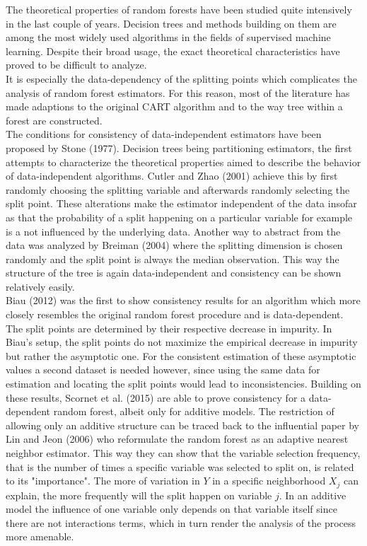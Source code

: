 {The theoretical properties of random forests have been studied quite intensively in the last couple of years. Decision trees and methods building on them are among the most widely used algorithms in the fields of supervised machine learning. Despite their broad usage, the exact theoretical characteristics have proved to be difficult to analyze. \\
It is especially the data-dependency of the splitting points which complicates the analysis of random forest estimators. For this reason, most of the literature has made adaptions to the original CART algorithm and to the way tree within a forest are constructed. \\
The conditions for consistency of data-independent estimators have been proposed by Stone (1977). Decision trees being partitioning estimators, the first attempts to characterize the theoretical properties aimed to describe the behavior of data-independent algorithms. Cutler and Zhao (2001) achieve this by first randomly choosing the splitting variable and afterwards randomly selecting the split point. These alterations make the estimator independent of the data insofar as that the probability of a split happening on a particular variable for example is a not influenced by the underlying data. Another way to abstract from the data was analyzed by Breiman (2004) where the splitting dimension is chosen randomly and the split point is always the median observation. This way the structure of the tree is again data-independent and consistency can be shown relatively easily. \\
Biau (2012) was the first to show consistency results for an algorithm which more closely resembles the original random forest procedure and is data-dependent. The split points are determined by their respective decrease in impurity. In Biau's setup, the split points do not maximize the empirical decrease in impurity but rather the asymptotic one. For the consistent estimation of these asymptotic values a second dataset is needed however, since using the same data for estimation and locating the split points would lead to inconsistencies. Building on these results, Scornet et al. (2015) are able to prove consistency for a data-dependent random forest, albeit only for additive models. The restriction of allowing only an additive structure can be traced back to the influential paper by Lin and Jeon (2006) who reformulate the random forest as an adaptive nearest neighbor estimator. This way they can show that the variable selection frequency, that is the number of times a specific variable was selected to split on, is related to its "importance". The more of variation in $Y$ in a specific neighborhood $X_j$ can explain, the more frequently will the split happen on variable $j$. In an additive model the influence of one variable only depends on that variable itself since there are not interactions terms, which in turn render the analysis of the process more amenable. \\
}
